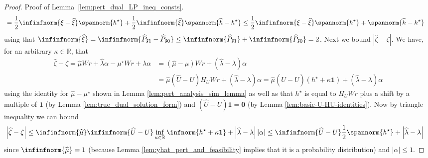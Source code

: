 \documentclass[mnsc,nonblindrev]{informs3}
\newcommand{\R}{\mathbb{R}}
\newcommand{\Phat}{\widehat{P}}
\newcommand{\one}{\mathbf{1}}
\newcommand{\hhat}{\widehat{h}}
\newcommand{\zero}{\mathbf{0}}
\newcommand{\muhat}{\widehat{\mu}}
\newcommand{\uhat}{\widehat{U}}
\newcommand{\xihat}{\widehat{\xi}}
\newcommand{\zetahat}{\widehat{\zeta}}
\newcommand{\lambdahat}{\widehat{\lambda}}
\begin{document}
\begin{APPENDICES}
\begin{proof}{Proof of Lemma~\ref{lem:pert_dual_LP_ineq_consts}.}
\begin{align*}
    &= \frac{1}{2}\infinfnorm{\xi - \xihat} \spannorm{h^\star} +  \frac{1}{2}\infinfnorm{\xihat} \spannorm{\hhat - h^\star} 
    \leq \frac{1}{2}\infinfnorm{\xi - \xihat} \spannorm{h^\star} + \spannorm{\hhat - h^\star}
\end{align*}
using that $\infinfnorm{\xihat} = \infinfnorm{\Phat_{\tilde s 1} - \Phat_{\tilde s 0}} \leq \infinfnorm{\Phat_{\tilde s 1}} + \infinfnorm{ \Phat_{\tilde s 0}} = 2$.
Next we bound $|\zetahat - \zeta|$. We have, for an arbitrary $\kappa \in \R$, that
\begin{align*}
    \zetahat - \zeta 
    = \muhat Wr + \lambdahat \alpha - \mu^\star Wr + \lambda \alpha 
    &= (\muhat - \mu) Wr + (\lambdahat - \lambda) \alpha \\
    & = \muhat (\uhat - U) H_U Wr + (\lambdahat - \lambda) \alpha = \muhat (\uhat - U ) (h^\star +\kappa \one) + (\lambdahat - \lambda) \alpha
\end{align*}
using the identity for $\muhat - \mu^\star$ shown in Lemma \ref{lem:pert_analysis_sim_lemma} as well as that $h^\star$ is equal to $H_U W r$ plus a shift by a multiple of $\one$ (by Lemma \ref{lem:true_dual_solution_form}) and $(\uhat - U ) \one = \zero$ (by Lemma \ref{lem:basic-U-HU-identities}). 
Now by triangle inequality we can bound
\begin{align*}
    \left| \zetahat - \zeta \right| 
    & \leq \infinfnorm{\muhat} \infinfnorm{\uhat - U} \inf_{\kappa \in \R} \infnorm{h^\star + \kappa \one} + \left|\lambdahat - \lambda \right||\alpha| 
    \leq \infinfnorm{\uhat - U} \frac{1}{2}\spannorm{h^\star} + \left|\lambdahat - \lambda \right|
\end{align*}
since $\infinfnorm{\muhat} = 1$ (because Lemma \ref{lem:yhat_pert_and_feasibility} implies that it is a probability distribution) and $|\alpha| \leq 1$.


\end{proof}
\end{APPENDICES}
\end{document}
